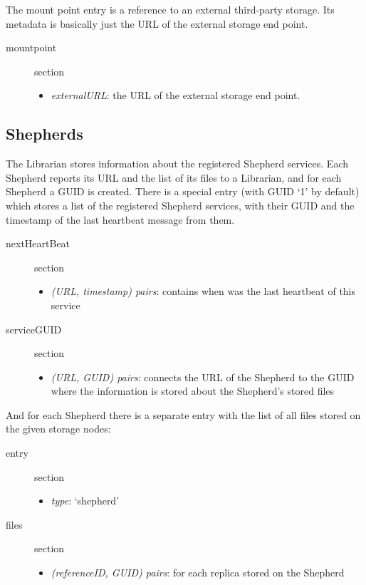 \documentclass{book}
\begin{document}
The mount point entry is a reference to an external third-party storage. Its metadata is basically just the URL of the external storage end point.

\begin{description}
    \item [mountpoint] section 
    \begin{itemize}
        \item \emph{externalURL}: the URL of the external storage end point.
    \end{itemize}
\end{description}



\subsection{Shepherds} %
\label{sub:shepherds}

The Librarian stores information about the registered Shepherd services. Each Shepherd reports its URL and the list of its files to a Librarian, and for each Shepherd a GUID is created. There is a special entry (with GUID `1' by default) which stores a list of the registered Shepherd services, with their GUID and the timestamp of the last heartbeat message from them.

\begin{description}
	\item [nextHeartBeat] section
	\begin{itemize}
		\item \emph{(URL, timestamp) pairs}: contains when was the last heartbeat of this service
	\end{itemize}
	\item [serviceGUID] section
    \begin{itemize}
        \item \emph{(URL, GUID) pairs}: connects the URL of the Shepherd to the GUID where the information is stored about the Shepherd's stored files
    \end{itemize}
\end{description}

And for each Shepherd there is a separate entry with the list of all files stored on the given storage nodes:

\begin{description}
	\item [entry] section
    \begin{itemize}
        \item \emph{type}: `shepherd'
    \end{itemize}
	\item [files] section
	\begin{itemize}
	    \item \emph{(referenceID, GUID) pairs}: for each replica stored on the Shepherd
	\end{itemize}
\end{description}
\end{document}
